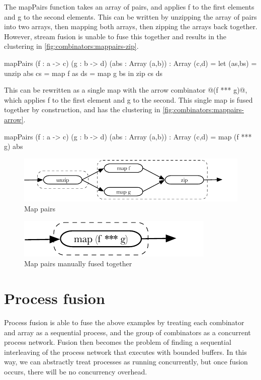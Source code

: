The mapPairs function takes an array of pairs, and applies f to the first elements and g to the second elements.
This can be written by unzipping the array of pairs into two arrays, then mapping both arrays, then zipping the arrays back together.
However, stream fusion is unable to fuse this together and results in the clustering in \autoref{fig:combinators:mappairs-zip}.

\begin{code}
mapPairs (f : a -> c) (g : b -> d) (abs : Array (a,b)) : Array (c,d)
 = let (as,bs) = unzip abs
        cs     = map f as
        ds     = map g bs
   in  zip cs ds
\end{code}

This can be rewritten as a single map with the arrow combinator @(f *** g)@, which applies f to the first element and g to the second.
This single map is fused together by construction, and has the clustering in \autoref{fig:combinators:mappairs-arrow}.

\begin{code}
mapPairs (f : a -> c) (g : b -> d) (abs : Array (a,b)) : Array (c,d)
 = map (f *** g) abs
\end{code}

\begin{figure}
\center
\includegraphics{figs/combinators/mappairs-zip.pdf}
\caption{Map pairs}
\label{fig:combinators:mappairs-zip}
\end{figure}

\begin{figure}
\center
\includegraphics{figs/combinators/mappairs-arrow.pdf}
\caption{Map pairs manually fused together}
\label{fig:combinators:mappairs-arrow}
\end{figure}

\section{Process fusion}

Process fusion is able to fuse the above examples by treating each combinator and array as a sequential process, and the group of combinators as a concurrent process network.
Fusion then becomes the problem of finding a sequential interleaving of the process network that executes with bounded buffers.
In this way, we can abstractly treat processes as running concurrently, but once fusion occurs, there will be no concurrency overhead.

